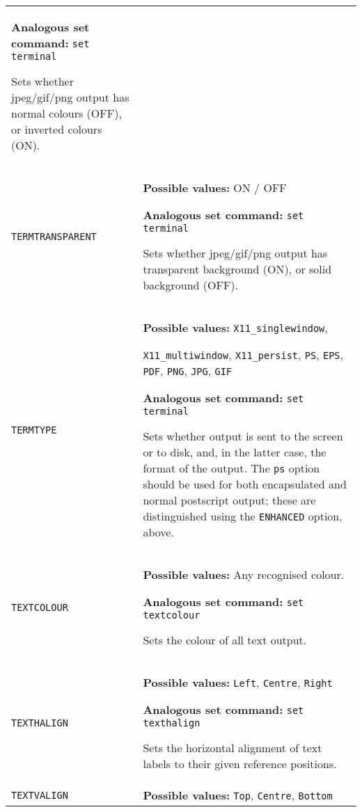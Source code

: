 \documentclass[a4paper,onecolumn,11pt]{book}
\begin{document}
\begin{longtable}{p{3.4cm}p{9cm}}
                   \textbf{Analogous set command:} \texttt{set terminal}\index{set terminal command@\texttt{set terminal} command}

                   Sets whether jpeg/gif/png output has normal colours (OFF), or inverted colours (ON).
                   \\
\texttt{TERMTRANSPARENT} & \textbf{Possible values:} ON / OFF

                   \textbf{Analogous set command:} \texttt{set terminal}\index{set terminal command@\texttt{set terminal} command}

                   Sets whether jpeg/gif/png output has transparent background (ON), or solid background (OFF).
                   \\
\texttt{TERMTYPE} & \textbf{Possible values:} \texttt{X11\_singlewindow},

                   \texttt{X11\_multiwindow}, \texttt{X11\_persist}, \texttt{PS}, \texttt{EPS}, \texttt{PDF}, \texttt{PNG}, \texttt{JPG}, \texttt{GIF}

                   \textbf{Analogous set command:} \texttt{set terminal}\index{set terminal command@\texttt{set terminal} command}

                   Sets whether output is sent to the screen or to disk, and, in the latter case, the format of the output. The \texttt{ps} option should be used for both encapsulated and normal postscript output; these are distinguished using the \texttt{ENHANCED} option, above.
                   \\
\texttt{TEXTCOLOUR} & \textbf{Possible values:} Any recognised colour.

                   \textbf{Analogous set command:} \texttt{set textcolour}\index{set textcolour command@\texttt{set textcolour} command}

                   Sets the colour of all text output.
                   \\
\texttt{TEXTHALIGN} & \textbf{Possible values:} \texttt{Left}, \texttt{Centre}, \texttt{Right}

                   \textbf{Analogous set command:} \texttt{set texthalign}\index{set texthalign command@\texttt{set texthalign} command}

                   Sets the horizontal alignment of text labels to their given reference positions.
                   \\
\texttt{TEXTVALIGN} & \textbf{Possible values:} \texttt{Top}, \texttt{Centre}, \texttt{Bottom}


\end{longtable}
\end{document}
